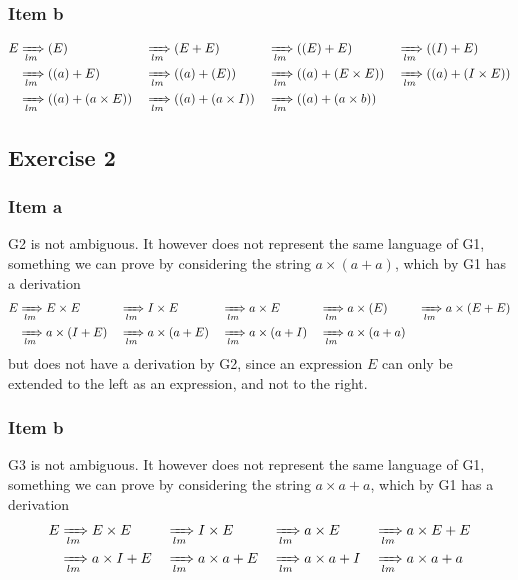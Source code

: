 \documentclass[docid=PA07]{tcom_PA}
\begin{document}
{\subsubsection{Item b}
\begin{alignat*}{6}
	E
	& \xRightarrow[lm]{} (E)
	&&\xRightarrow[lm]{} (E+E)
	&&\xRightarrow[lm]{} ((E)+E)
	&&\xRightarrow[lm]{} ((I)+E) \\
	& \xRightarrow[lm]{} ((a)+E)
	&&\xRightarrow[lm]{} ((a)+(E)) 
	&&\xRightarrow[lm]{} ((a)+(E \times E))
	&&\xRightarrow[lm]{} ((a)+(I \times E)) \\ 
	& \xRightarrow[lm]{} ((a)+(a \times E)) 
	&&\xRightarrow[lm]{} ((a)+(a \times I)) 
	&&\xRightarrow[lm]{} ((a)+(a \times b)) 
\end{alignat*}
\begin{center}
\end{center}
\subsection{Exercise 2}
\subsubsection{Item a}
G2 is not ambiguous. It however does not represent the same language of G1, something we can prove by considering the string $a \times (a+a)$, which by G1 has a derivation
\begin{alignat*}{6}
	E
	&\xRightarrow[lm]{} E \times E
	&&\xRightarrow[lm]{} I \times E
	&&\xRightarrow[lm]{} a \times E
	&&\xRightarrow[lm]{} a \times (E)
	&&\xRightarrow[lm]{} a \times (E+E) \\
	&\xRightarrow[lm]{} a \times (I+E)
	&&\xRightarrow[lm]{} a \times (a+E)
	&&\xRightarrow[lm]{} a \times (a+I)
	&&\xRightarrow[lm]{} a \times (a+a)
\end{alignat*}
but does not have a derivation by G2, since an expression $E$ can only be extended to the left as an expression, and not to the right.
\subsubsection{Item b}
G3 is not ambiguous. It however does not represent the same language of G1, something we can prove by considering the string $a \times a+a$, which by G1 has a derivation
\begin{alignat*}{6}
	E
	&\xRightarrow[lm]{} E \times E
	&&\xRightarrow[lm]{} I \times E
	&&\xRightarrow[lm]{} a \times E
	&&\xRightarrow[lm]{} a \times E+E \\
	&\xRightarrow[lm]{} a \times I+E
	&&\xRightarrow[lm]{} a \times a+E
	&&\xRightarrow[lm]{} a \times a+I
	&&\xRightarrow[lm]{} a \times a+a
\end{alignat*}
}
\end{document}
